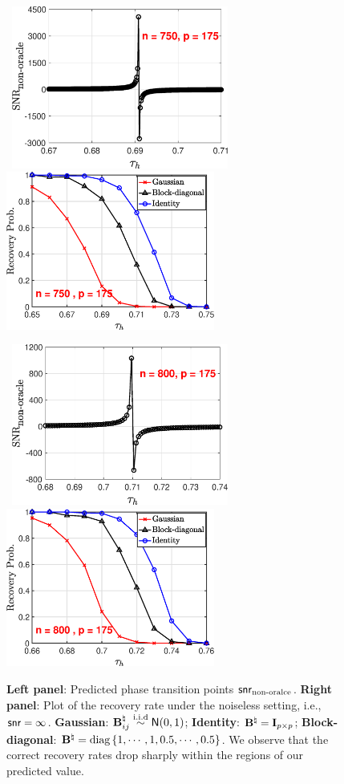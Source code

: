 \documentclass[11pt]{article}
\def \bBtrue {\bB^{\natural}}
\begin{document}
\begin{figure}[h]
\mbox{
\includegraphics[width = 2.8in]{figs/snr_nonracle_n750_p175.eps}\hspace{0.2in}
\includegraphics[width = 2.7in]{figs/DiffB_mat_n750_p175.eps}
}

\mbox{
\includegraphics[width = 2.8in]{figs/snr_nonracle_n800_p175.eps}\hspace{0.2in}
\includegraphics[width = 2.7in]{figs/DiffB_mat_n800_p175.eps}
}

\vspace{-0.1in}




\caption{\textbf{Left panel}:
Predicted phase transition points $\mathsf{snr}_{\textup{non-oralce}}$.
\textbf{Right panel}: Plot of the recovery rate under the noiseless
setting, i.e., $\mathsf{snr} = \infty$. \textbf{Gaussian}: $\bBtrue_{ij}\iid \normdist(0, 1)$; \textbf{Identity}: $\bBtrue = \bI_{p\times p}$;
\textbf{Block-diagonal}: $\bBtrue = \diag\set{1, \cdots, 1, 0.5, \cdots, 0.5}$. We observe that the
correct recovery rates drop sharply within the
regions of our predicted value.
}\label{fig:nonoracle_snr}%
\end{figure}
\end{document}
